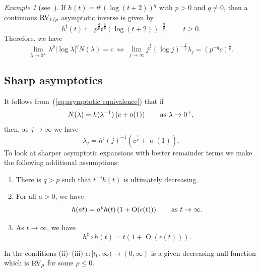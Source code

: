 \documentclass[10pt, a4paper]{amsart}
\newcommand{\op}{\operatorname}
\numberwithin{equation}{section}
\theoremstyle{definition}
\theoremstyle{remark}
\newtheorem{example}[theorem]{Example}
\newcommand{\RV}{\textup{RV}}
\begin{document}
\begin{example}[see~\cite{PT:Part1}]\label{ex:asymp inverse}
 If  $h(t)=t^p(\log(t+2))^q$ with $p>0$ and $q\neq 0$, then a continuous $\RV_{1/p}$ asymptotic inverse is given by
\begin{equation*}
 h^\sharp(t):= p^{\frac{q}{p}} t^{\frac{1}{p}} \left(\log(t+2)\right)^{-\frac{q}{p}}, \qquad t\geq 0.
\end{equation*}
Therefore, we have
\begin{equation}\label{eq:App.principa-asymp-tplogtq}
 \lim_{\lambda\rightarrow 0^+} \lambda^p|\log \lambda|^qN(\lambda)=c \ \Longleftrightarrow \ \lim_{j\rightarrow \infty} j^{\frac1p} (\log j)^{-\frac{q}{p}}\lambda_j =
 \left(p^{-q}c\right)^{\frac1p}.
\end{equation}
\end{example}

\subsection{Sharp asymptotics}
It follows from~(\ref{eq:asymptotic equivalence}) that if
\begin{equation*}
 N(\lambda)=h(\lambda^{-1})\left(c+\op{o}(1)\right) \qquad \textup{as}\ \lambda\rightarrow 0^+,
\end{equation*}
then, as $j\rightarrow \infty$ we have
\begin{equation*}
 \lambda_j =h^\sharp(j)^{-1}\left(c^{\frac1p}+\op{o}(1)\right).
\end{equation*}
To look at sharper asymptotic expansions with better remainder terms we make the following additional assumptions:
\begin{enumerate}
 \item[(i)] There is $q>p$ such that $t^{-q}h(t)$ is ultimately decreasing.

 \item[(ii)] For all $a>0$, we have
 \begin{equation}\label{cond:ii}
 h(at)=a^p h(t)\left(1+\op{O}(\epsilon(t))\right) \qquad \textup{as}\ t\rightarrow \infty.
\end{equation}

\item[(iii)] As $t\rightarrow \infty$, we have
\begin{equation}\label{cond:hsharp}
 h^\sharp\circ h(t)= t\left(1+\op{O}(\epsilon(t))\right).
\end{equation}
\end{enumerate}
In the conditions (ii)--(iii) $\epsilon: [t_0,\infty)\rightarrow (0,\infty)$ is a given decreasing null function which is $\RV_\rho$ for some $\rho\leq 0$.
\end{document}
